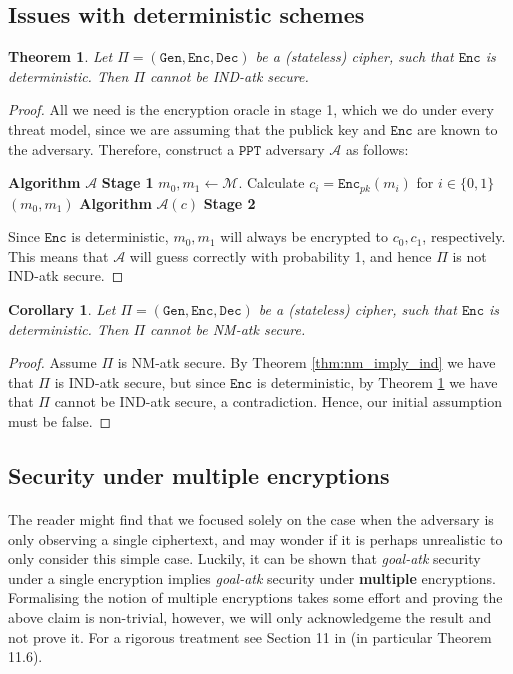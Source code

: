 \documentclass{article}
\newtheorem{theorem}{Theorem}[section]
\newtheorem{corollary}{Corollary}[theorem]
\theoremstyle{definition}
\theoremstyle{example}
\newcommand{\Enc}{\texttt{Enc}}
\newcommand{\Dec}{\texttt{Dec}}
\newcommand{\Gen}{\texttt{Gen}}
\newcommand{\M}{\mathcal{M}}
\newcommand{\A}{\mathcal{A}}
\newcommand{\PPT}{\texttt{PPT}}
\begin{document}
\subsection{Issues with deterministic schemes}
\begin{theorem}
  \label{thm:determ_enc_insecure}
  Let $\Pi = (\Gen, \Enc, \Dec)$ be a (stateless) cipher, such that $\Enc$ is deterministic.
  Then $\Pi$ cannot be IND-atk secure.
\end{theorem}
\begin{proof}
  All we need is the encryption oracle in stage 1, which we do under every
  threat model, since we are assuming that the publick key and $\Enc$ are known
  to the adversary. Therefore, construct a $\PPT$ adversary $\A$ as follows:
  \begin{algorithmic}
    \State \textbf{Algorithm} $\A$ \textbf{Stage 1}
    \State $m_0, m_1 \leftarrow \M$.
    \State Calculate $c_i = \Enc_{pk}(m_i)$ for $i \in \{0, 1\}$
    \State \Return $(m_0, m_1)$
    \State
    \State \textbf{Algorithm} $\A(c)$ \textbf{Stage 2}
     \EndIf
    \State
  \end{algorithmic}
  Since $\Enc$ is deterministic, $m_0, m_1$ will always be encrypted to $c_0,
  c_1$, respectively. This means that $\A$ will guess correctly with probability 1,
  and hence $\Pi$ is not IND-atk secure.
\end{proof}
\begin{corollary}
  \label{cor:determ_nm_insecure}
  Let $\Pi = (\Gen, \Enc, \Dec)$ be a (stateless) cipher, such that $\Enc$ is deterministic.
  Then $\Pi$ cannot be NM-atk secure.
\end{corollary}
\begin{proof}
  Assume $\Pi$ is NM-atk secure. By Theorem \ref{thm:nm_imply_ind} we have that
  $\Pi$ is IND-atk secure, but since $\Enc$ is deterministic, by Theorem \ref{thm:determ_enc_insecure} we have
  that $\Pi$ cannot be IND-atk secure, a contradiction. Hence, our initial
  assumption must be false.
\end{proof}
\subsection{Security under multiple encryptions}
\paragraph{} The reader might find that we focused solely on the case when the
adversary is only observing a single ciphertext, and may wonder if it is perhaps
unrealistic to only consider this simple case. Luckily, it can be shown that \textit{goal-atk}
security under a single encryption implies \textit{goal-atk} security under
\textbf{multiple} encryptions. Formalising the notion of multiple encryptions
takes some effort and proving the above claim is non-trivial, however, we will
only acknowledgeme the result and not prove it. For a rigorous treatment see
Section 11 in \cite{katz2014introduction} (in particular Theorem 11.6).
\end{document}
